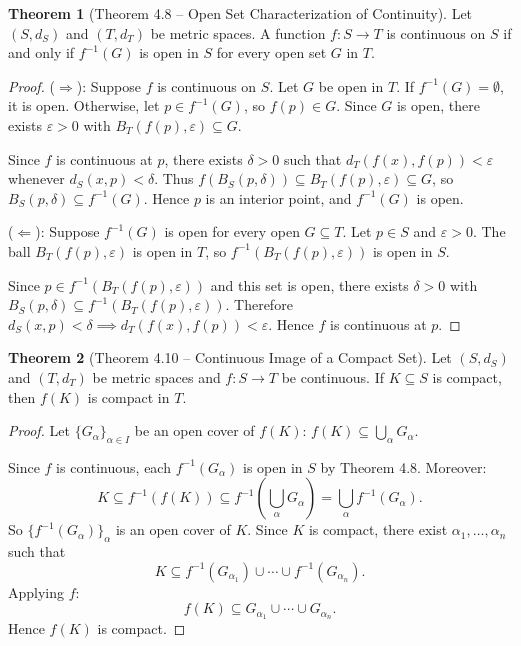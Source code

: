 \documentclass[12pt,a4paper]{article}
\theoremstyle{definition}
\newtheorem{theorem}{Theorem}[section]
\newcommand{\eps}{\varepsilon}
\begin{document}
\begin{theorem}[Theorem 4.8 -- Open Set Characterization of Continuity]
Let $(S, d_S)$ and $(T, d_T)$ be metric spaces. A function $f: S \to T$ is continuous on $S$ if and only if $f^{-1}(G)$ is open in $S$ for every open set $G$ in $T$.
\end{theorem}

\begin{proof}
($\Rightarrow$): Suppose $f$ is continuous on $S$. Let $G$ be open in $T$. If $f^{-1}(G) = \emptyset$, it is open. Otherwise, let $p \in f^{-1}(G)$, so $f(p) \in G$. Since $G$ is open, there exists $\eps > 0$ with $B_T(f(p), \eps) \subseteq G$.

Since $f$ is continuous at $p$, there exists $\delta > 0$ such that $d_T(f(x), f(p)) < \eps$ whenever $d_S(x, p) < \delta$. Thus $f(B_S(p, \delta)) \subseteq B_T(f(p), \eps) \subseteq G$, so $B_S(p, \delta) \subseteq f^{-1}(G)$. Hence $p$ is an interior point, and $f^{-1}(G)$ is open.

\medskip
($\Leftarrow$): Suppose $f^{-1}(G)$ is open for every open $G \subseteq T$. Let $p \in S$ and $\eps > 0$. The ball $B_T(f(p), \eps)$ is open in $T$, so $f^{-1}(B_T(f(p), \eps))$ is open in $S$.

Since $p \in f^{-1}(B_T(f(p), \eps))$ and this set is open, there exists $\delta > 0$ with $B_S(p, \delta) \subseteq f^{-1}(B_T(f(p), \eps))$. Therefore $d_S(x, p) < \delta \implies d_T(f(x), f(p)) < \eps$. Hence $f$ is continuous at $p$.
\end{proof}

\begin{theorem}[Theorem 4.10 -- Continuous Image of a Compact Set]
Let $(S, d_S)$ and $(T, d_T)$ be metric spaces and $f: S \to T$ be continuous. If $K \subseteq S$ is compact, then $f(K)$ is compact in $T$.
\end{theorem}

\begin{proof}
Let $\{G_\alpha\}_{\alpha \in I}$ be an open cover of $f(K)$: $f(K) \subseteq \bigcup_\alpha G_\alpha$.

Since $f$ is continuous, each $f^{-1}(G_\alpha)$ is open in $S$ by Theorem 4.8. Moreover:
\[
    K \subseteq f^{-1}(f(K)) \subseteq f^{-1}\!\left(\bigcup_\alpha G_\alpha\right) = \bigcup_\alpha f^{-1}(G_\alpha).
\]
So $\{f^{-1}(G_\alpha)\}_\alpha$ is an open cover of $K$. Since $K$ is compact, there exist $\alpha_1, \ldots, \alpha_n$ such that
\[
    K \subseteq f^{-1}(G_{\alpha_1}) \cup \cdots \cup f^{-1}(G_{\alpha_n}).
\]
Applying $f$:
\[
    f(K) \subseteq G_{\alpha_1} \cup \cdots \cup G_{\alpha_n}.
\]
Hence $f(K)$ is compact.
\end{proof}
\end{document}
